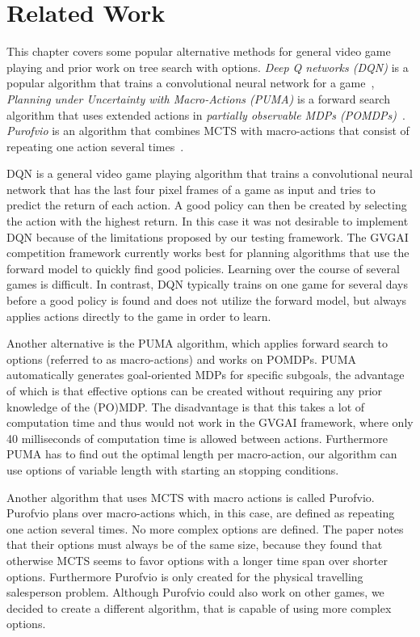 \section{Related Work}
\label{sec:related}
This chapter covers some popular alternative methods for general video game
playing and prior work on tree search with options. \emph{Deep Q networks (DQN)}
is a popular algorithm that trains a convolutional neural network for a
game~\cite{mnih2013playing}, \emph{Planning under Uncertainty with Macro-Actions
(PUMA)} is a forward search algorithm that uses extended actions in
\emph{partially observable MDPs (POMDPs)}~\cite{he2010puma}. \emph{Purofvio} is
an algorithm that combines MCTS with macro-actions that consist of repeating one
action several times~\cite{powley2012monte}.

DQN is a general video game playing algorithm that trains a convolutional neural
network that has the last four pixel frames of a game as input and tries to
predict the return of each action. A good policy can then be created by
selecting the action with the highest return. In this case it was not desirable
to implement DQN because of the limitations proposed by our testing framework.
The GVGAI competition framework currently works best for planning algorithms
that use the forward model to quickly find good policies. Learning over the
course of several games is difficult. In contrast, DQN typically trains on one
game for several days before a good policy is found and does not utilize the
forward model, but always applies actions directly to the game in order to
learn.

Another alternative is the PUMA algorithm, which applies forward search to
options (referred to as macro-actions) and works on POMDPs. PUMA automatically
generates goal-oriented MDPs for specific subgoals, the advantage of which is
that effective options can be created without requiring any prior knowledge of
the (PO)MDP\@. The disadvantage is that this takes a lot of computation time and
thus would not work in the GVGAI framework, where only 40 milliseconds of
computation time is allowed between actions. Furthermore PUMA has to find out the
optimal length per macro-action, our algorithm can use options of variable
length with starting an stopping conditions.

Another algorithm that uses MCTS with macro actions is called Purofvio.
Purofvio plans over macro-actions which, in this case, are defined as repeating
one action several times. No more complex options are defined. The paper notes
that their options must always be of the same size, because they found that
otherwise MCTS seems to favor options with a longer time span over shorter
options. Furthermore Purofvio is only created for the physical travelling
salesperson problem. Although Purofvio could also work on other games, we
decided to create a different algorithm, that is capable of using more complex
options.

